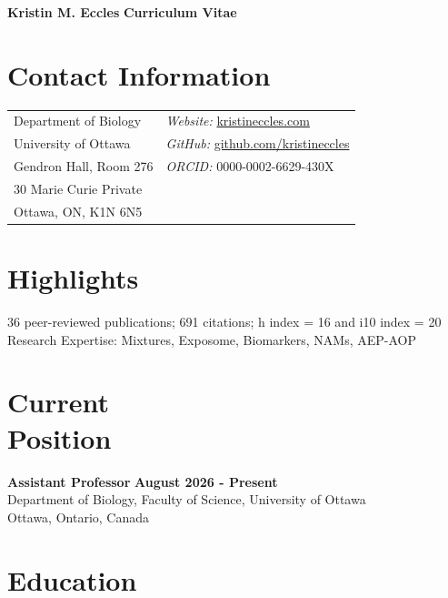 \documentclass[margin,line]{res}
\begin{document}
\begin{flushleft}
		\huge \textbf{Kristin M. Eccles}
		\hfill {\LARGE \textbf{Curriculum Vitae}}\\
\end{flushleft}

\begin{resume}

\section{\sc Contact Information}
\vspace{.05in}
\begin{tabular}{@{}p{3.2in}p{2.5in}}
Department of Biology & {\it Website:} \href{https://kristineccles.com}{kristineccles.com}\\
University of Ottawa & {\it GitHub:} \href{https://github.com/kristineccles}{github.com/kristineccles}\\
Gendron Hall, Room 276 & {\it ORCID:} 0000-0002-6629-430X\\
30 Marie Curie Private & {}\\
Ottawa, ON, K1N 6N5 & {}\\

\end{tabular}

\vspace*{.1in}
\section{\sc Highlights}
36 peer-reviewed publications; 691 citations; h index = 16 and i10 index = 20
\\
Research Expertise: Mixtures, Exposome, Biomarkers, NAMs, AEP-AOP

\vspace*{.1in}
\section{\sc Current\\Position}

{\bf  Assistant Professor} \hfill {\bf August 2026 - Present}\\
Department of Biology, Faculty of Science, University of Ottawa\\
Ottawa, Ontario, Canada

\vspace*{.1in}
\section{\sc Education}


\end{resume}
\end{document}
